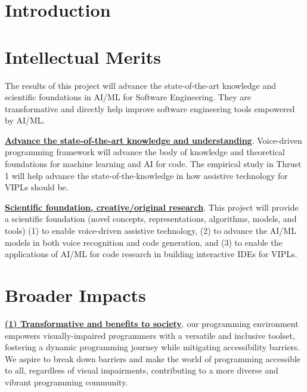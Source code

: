 \section{Introduction}\label{sec:intro}



%





\section{Intellectual Merits}

The results of this project will advance the state-of-the-art
knowledge and scientific foundations in AI/ML for Software
Engineering. They are transformative and directly help improve
software engineering tools empowered by AI/ML.

\noindent \underline{{\bf Advance the state-of-the-art knowledge and
    understanding}}. Voice-driven programming framework will advance
the body of knowledge and theoretical foundations for machine learning
and AI for code. The empirical study in Thrust 1 will help advance the
state-of-the-knowledge in how assistive technology for VIPLs should
be.

\noindent \underline{{\bf Scientific foundation, creative/original
    research}}. This project will provide a scientific foundation
(novel concepts, representations, algorithms, models, and tools) (1)
to enable voice-driven assistive technology, (2) to advance the AI/ML
models in both voice recognition and code generation, and (3) to
enable the applications of AI/ML for code research in building
interactive IDEs for VIPLs.

\section{Broader Impacts}

\underline{{\bf (1) Transformative and benefits to society}}. our
programming environment empowers visually-impaired programmers with a
versatile and inclusive toolset, fostering a dynamic programming
journey while mitigating accessibility barriers. We aspire to break
down barriers and make the world of programming accessible to all,
regardless of visual impairments, contributing to a more diverse and
vibrant programming community.


